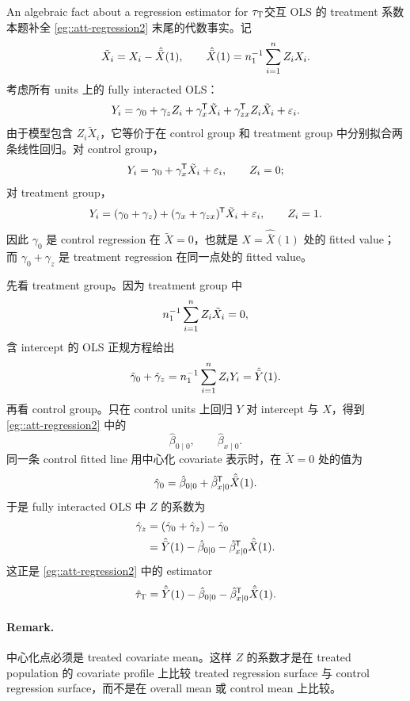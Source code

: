 \begin{exercisesolution}{An algebraic fact about a regression estimator for $\tau_\textsc{T}$}{交互 OLS 的 treatment 系数}
本题补全 \cref{eg::att-regression2} 末尾的代数事实。记
\[
\tilde X_i=X_i-\hat{\bar X}(1),\qquad
\hat{\bar X}(1)=n_1^{-1}\sum_{i=1}^n Z_iX_i.
\]
考虑所有 units 上的 fully interacted OLS：
\[
Y_i=\gamma_0+\gamma_zZ_i+\gamma_x^{\mkern-1.5mu\mathsf{T}} \tilde X_i
      +\gamma_{zx}^{\mkern-1.5mu\mathsf{T}} Z_i\tilde X_i+\varepsilon_i.
\]
由于模型包含 $Z_i\tilde X_i$，它等价于在 control group 和 treatment group 中分别拟合两条线性回归。对 control group，
\[
Y_i=\gamma_0+\gamma_x^{\mkern-1.5mu\mathsf{T}} \tilde X_i+\varepsilon_i,\qquad Z_i=0;
\]
对 treatment group，
\[
Y_i=(\gamma_0+\gamma_z)+(\gamma_x+\gamma_{zx})^{\mkern-1.5mu\mathsf{T}} \tilde X_i+\varepsilon_i,\qquad Z_i=1.
\]
因此 $\gamma_0$ 是 control regression 在 $\tilde X=0$，也就是 $X=\hat{\bar X}(1)$ 处的 fitted value；而 $\gamma_0+\gamma_z$ 是 treatment regression 在同一点处的 fitted value。

先看 treatment group。因为 treatment group 中
\[
n_1^{-1}\sum_{i=1}^n Z_i\tilde X_i=0,
\]
含 intercept 的 OLS 正规方程给出
\[
\hat\gamma_0+\hat\gamma_z
=n_1^{-1}\sum_{i=1}^n Z_iY_i
=\hat{\bar Y}(1).
\]
再看 control group。只在 control units 上回归 $Y$ 对 intercept 与 $X$，得到 \cref{eg::att-regression2} 中的
\[
\hat\beta_{0\mid 0},\qquad \hat\beta_{x\mid 0}.
\]
同一条 control fitted line 用中心化 covariate 表示时，在 $\tilde X=0$ 处的值为
\[
\hat\gamma_0
=\hat\beta_{0\mid 0}+\hat\beta_{x\mid 0}^{\mkern-1.5mu\mathsf{T}} \hat{\bar X}(1).
\]
于是 fully interacted OLS 中 $Z$ 的系数为
\begin{align*}
\hat\gamma_z
&=(\hat\gamma_0+\hat\gamma_z)-\hat\gamma_0 \\
&=\hat{\bar Y}(1)
  -\hat\beta_{0\mid 0}
  -\hat\beta_{x\mid 0}^{\mkern-1.5mu\mathsf{T}} \hat{\bar X}(1).
\end{align*}
这正是 \cref{eg::att-regression2} 中的 estimator
\[
\hat{\tau}_\textsc{T}
=\hat{\bar Y}(1)
  -\hat\beta_{0\mid 0}
  -\hat\beta_{x\mid 0}^{\mkern-1.5mu\mathsf{T}} \hat{\bar X}(1).
\]

\paragraph{Remark.}
中心化点必须是 treated covariate mean。这样 $Z$ 的系数才是在 treated population 的 covariate profile 上比较 treated regression surface 与 control regression surface，而不是在 overall mean 或 control mean 上比较。
\end{exercisesolution}

